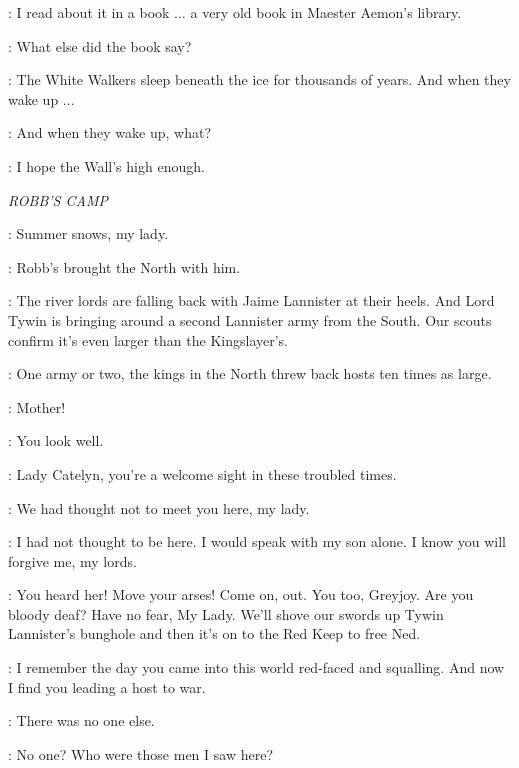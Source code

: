 \SAM: I read about it in a book $\ldots$ a very old book in Maester Aemon's library. 

\JON: What else did the book say? 

\SAM: The White Walkers sleep beneath the ice for thousands of years. And when they wake up $\ldots$  

\PYP: And when they wake up, what? 

\SAM: I hope the Wall's high enough. 


\scene

\textit{ROBB'S CAMP} 


\RODRIK: Summer snows, my lady. 

\CATELYN: Robb's brought the North with him. 

\ROBB: The river lords are falling back with Jaime Lannister at their heels. And Lord Tywin is bringing around a second Lannister army from the South. Our scouts confirm it's even larger than the Kingslayer's. 

\UMBER: One army or two, the kings in the North threw back hosts ten times as large. 


\ROBB: Mother!

\CATELYN: You look well. 

\UMBER: Lady Catelyn, you're a welcome sight in these troubled times. 

\GLOVER: We had thought not to meet you here, my lady. 

\CATELYN: I had not thought to be here. I would speak with my son alone. I know you will forgive me, my lords. 

\UMBER: You heard her! Move your arses! Come on, out.  You too, Greyjoy. Are you bloody deaf? Have no fear, My Lady. We'll shove our swords up Tywin Lannister's bunghole and then it's on to the Red Keep to free Ned. 


\CATELYN: I remember the day you came into this world red-faced and squalling. And now I find you leading a host to war. 

\ROBB: There was no one else. 

\CATELYN: No one? Who were those men I saw here? 

